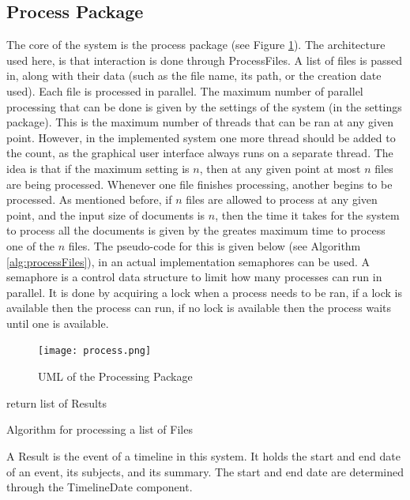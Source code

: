 \subsection{Process Package}
\par The core of the system is the process package (see Figure \ref{fig:process}). The architecture used here, is that interaction is done through ProcessFiles. A list of files is passed in, along with their data (such as the file name, its path, or the creation date used). Each file is processed in parallel. The maximum number of parallel processing that can be done is given by the settings of the system (in the settings package). This is the maximum number of threads that can be ran at any given point. However, in the implemented system one more thread should be added to the count, as the graphical user interface always runs on a separate thread. The idea is that if the maximum setting is $n$, then at any given point at most $n$ files are being processed. Whenever one file finishes processing, another begins to be processed. As mentioned before, if $n$ files are allowed to process at any given point, and the input size of documents is $n$, then the time it takes for the system to process all the documents is given by the greates maximum time to process one of the $n$ files. The pseudo-code for this is given below (see Algorithm \ref{alg:processFiles}), in an actual implementation semaphores can be used. A semaphore is a control data structure to limit how many processes can run in parallel. It is done by acquiring a lock when a process needs to be ran, if a lock is available then the process can run, if no lock is available then the process waits until one is available.
\begin{figure}[h]
\caption{UML of the Processing Package}
\label{fig:process}
\texttt{[image: process.png]}
\centering
\end{figure}
\begin{algorithm}
return list of Results\;
\caption{Algorithm for processing a list of Files}
\label{alg:processFiles}
\end{algorithm}
\par A Result is the event of a timeline in this system. It holds the start and end date of an event, its subjects, and its summary. The start and end date are determined through the TimelineDate component.
